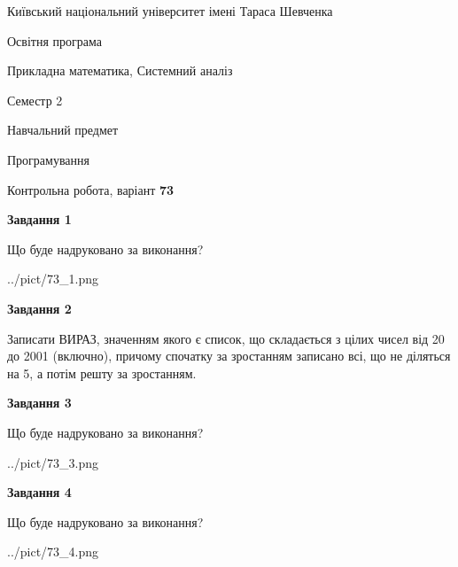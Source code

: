 \documentclass[12pt, ukrainian]{article}
\begin{document}
{{\begin {small}\par
{ \center  Київський національний університет імені Тараса Шевченка \par}
{\parbox {5 cm}{Освітня програма \hfill}{\parbox {8 cm}{Прикладна математика, Системний аналіз \hfill}}\parbox {5 cm}{\hfill Семестр 2}}\par
{\parbox {5 cm} {Навчальний предмет \hfill}\parbox {7 cm}{Програмування \hfill}\parbox {6cm}{\hfill}\par}\vspace{-7pt} \end{small}}{\center Контрольна робота, варіант  \No \textbf
{ 73 }\par}}
{
\begin {large}
{\begin {center}\textbf{Завдання 1}\end {center}}\par
Що буде надруковано за виконання?\par\par
\begin{center}
	{../pict/73_1.png}
\end{center}
\newpage

{\begin {center}\textbf{Завдання 2}\end {center}}\par

Записати ВИРАЗ, значенням якого є список, що складається з цілих чисел від 20 до 2001 (включно), причому спочатку за зростанням записано всі, що не діляться на 5, а потім решту за зростанням.\par
\newpage

{\begin {center}\textbf{Завдання 3}\end {center}}\par
Що буде надруковано за виконання?
\begin{center}
	{../pict/73_3.png}
\end{center}
\newpage

{\begin {center}\textbf{Завдання 4}\end {center}}\par
Що буде надруковано за виконання?\par
\begin{center}
	{../pict/73_4.png}
\end{center}
\newpage


\end{large}}
\end{document}
